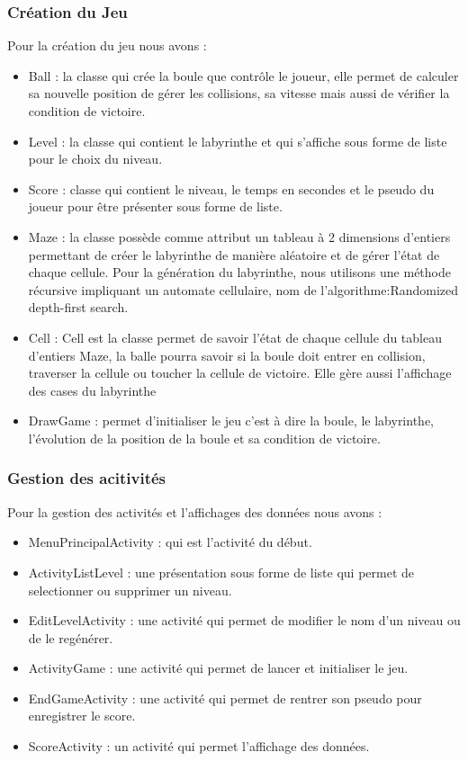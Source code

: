 \documentclass{article}
\begin{document}
\subsubsection{Création du Jeu}
Pour la création du jeu nous avons : 
\begin{itemize}
\item Ball : la classe qui crée la boule que contrôle le joueur, elle permet de calculer sa nouvelle position de gérer les collisions, sa vitesse mais aussi de vérifier la condition de victoire.
\item Level : la classe qui contient le labyrinthe et qui s'affiche sous forme de liste pour le choix du niveau.
\item Score : classe qui contient le niveau, le temps en secondes et le pseudo du joueur pour être présenter sous forme de liste.
\item Maze : la classe possède comme attribut un tableau à 2 dimensions d'entiers permettant de créer le labyrinthe de manière aléatoire et de gérer l'état de chaque cellule. Pour la génération du labyrinthe, nous utilisons une méthode récursive impliquant un automate cellulaire, nom de l'algorithme:Randomized depth-first search.
\item Cell : Cell est la classe permet de savoir l'état de chaque cellule du tableau d'entiers Maze, la balle pourra savoir si la boule doit entrer en collision, traverser la cellule ou toucher la cellule de victoire. Elle gère aussi l'affichage des cases du labyrinthe
\item DrawGame : permet d'initialiser le jeu c'est à dire la boule, le labyrinthe, l'évolution de la position de la boule et sa condition de victoire.
\end{itemize}
\subsubsection{Gestion des acitivités}
Pour la gestion des activités et l'affichages des données nous avons :
\begin{itemize}
\item MenuPrincipalActivity : qui est l'activité du début.
\item ActivityListLevel : une présentation sous forme de liste qui permet de selectionner ou supprimer un niveau.
\item EditLevelActivity : une activité qui permet de modifier le nom d'un niveau ou de le regénérer. 
\item ActivityGame : une activité qui permet de lancer et initialiser le jeu.
\item EndGameActivity : une activité qui permet de rentrer son pseudo pour enregistrer le score.
\item ScoreActivity : un activité qui permet l'affichage des données.
\end{itemize}
\end{document}
